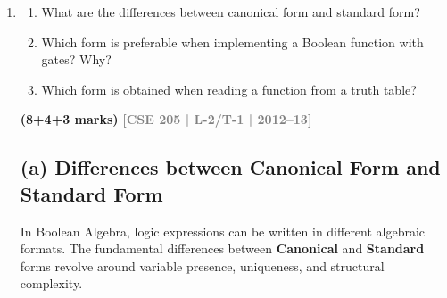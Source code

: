 \documentclass[12pt,a3paper]{article}
\newcommand{\yr}[1]{\hfill\textcolor{gray}{\small\textbf{[#1]}}}
\newcommand{\mk}[1]{\textcolor{orange!70!black}{\small\textbf{(#1 marks)}}}
\begin{document}
\begin{enumerate}
\begin{tcolorbox}[enhanced,breakable,ansbox,colback=cB!4,colframe=cB,boxrule=0.8pt,arc=5pt,title={\textbf{Answer}},fonttitle=\bfseries\color{white},colbacktitle=cB]
\end{tcolorbox}

\item
\begin{enumerate}
  \item What are the differences between canonical form and standard form?
  \item Which form is preferable when implementing a Boolean function with gates? Why?
  \item Which form is obtained when reading a function from a truth table?
\end{enumerate}
\mk{8+4+3} \yr{CSE 205 | L-2/T-1 | 2012--13}

\begin{tcolorbox}[enhanced,breakable,ansbox,colback=cB!4,colframe=cB,boxrule=0.8pt,arc=5pt,title={\textbf{Answer}},fonttitle=\bfseries\color{white},colbacktitle=cB]

\subsection*{(a) Differences between Canonical Form and Standard Form}

In Boolean Algebra, logic expressions can be written in different algebraic formats. The fundamental differences between \textbf{\textcolor{cB}{Canonical}} and \textbf{\textcolor{cB}{Standard}} forms revolve around variable presence, uniqueness, and structural complexity.


\end{tcolorbox}
\end{enumerate}
\end{document}
